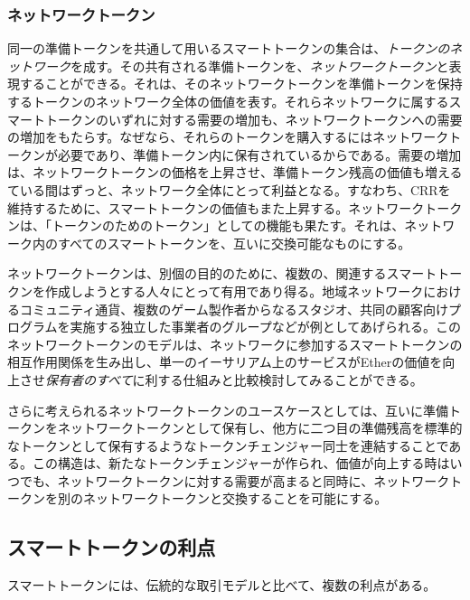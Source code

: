 \documentclass{jsarticle}
\begin{document}
    \subsubsection{ネットワークトークン}

    同一の準備トークンを共通して用いるスマートトークンの集合は、\emph{トークンのネットワーク}を成す。その共有される準備トークンを、\emph{ネットワークトークン}と表現することができる。それは、そのネットワークトークンを準備トークンを保持するトークンのネットワーク全体の価値を表す。それらネットワークに属するスマートトークンのいずれに対する需要の増加も、ネットワークトークンへの需要の増加をもたらす。なぜなら、それらのトークンを購入するにはネットワークトークンが必要であり、準備トークン内に保有されているからである。需要の増加は、ネットワークトークンの価格を上昇させ、準備トークン残高の価値も増えるている間はずっと、ネットワーク全体にとって利益となる。すなわち、CRRを維持するために、スマートトークンの価値もまた上昇する。ネットワークトークンは、「トークンのためのトークン」としての機能も果たす。それは、ネットワーク内のすべてのスマートトークンを、互いに交換可能なものにする。

    ネットワークトークンは、別個の目的のために、複数の、関連するスマートトークンを作成しようとする人々にとって有用であり得る。地域ネットワークにおけるコミュニティ通貨、複数のゲーム製作者からなるスタジオ、共同の顧客向けプログラムを実施する独立した事業者のグループなどが例としてあげられる。このネットワークトークンのモデルは、ネットワークに参加するスマートトークンの相互作用関係を生み出し、単一のイーサリアム上のサービスがEtherの価値を向上させ\emph{保有者のすべて}に利する仕組みと比較検討してみることができる。

    さらに考えられるネットワークトークンのユースケースとしては、互いに準備トークンをネットワークトークンとして保有し、他方に二つ目の準備残高を標準的なトークンとして保有するようなトークンチェンジャー同士を連結することである。この構造は、新たなトークンチェンジャーが作られ、価値が向上する時はいつでも、ネットワークトークンに対する需要が高まると同時に、ネットワークトークンを別のネットワークトークンと交換することを可能にする。

  \subsection{スマートトークンの利点}

  スマートトークンには、伝統的な取引モデルと比べて、複数の利点がある。
\end{document}
